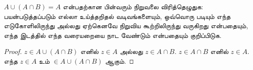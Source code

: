 \documentclass[../../../include/open-logic-section]{subfiles}
\begin{document}
\begin{prob}
$A \cup (A \cap B) = A$ என்பதற்கான பின்வரும்
நிறுவலை விரித்தெழுதுக: பயன்படுத்தப்படும் எல்லா
உய்த்தறிதல் வடிவங்களையும், ஒவ்வொரு படியும்
எந்த எடுகோளிலிருந்து அல்லது ஏற்கெனவே நிறுவிய
கூற்றிலிருந்து வருகிறது என்பதையும், எந்த இடத்தில்
எந்த வரையறையை நாட வேண்டும் என்பதையும் குறிப்பிடுக.
\begin{proof}
  $z \in A \cup (A \cap B)$ எனில் $z \in A$
  அல்லது $z \in A \cap B$. $z \in A \cap B$
  எனில் $z \in A$. எந்த $z \in A$ உம்
  $\in A \cup (A \cap B)$ ஆகும்.
\end{proof}
\end{prob}
\end{document}
